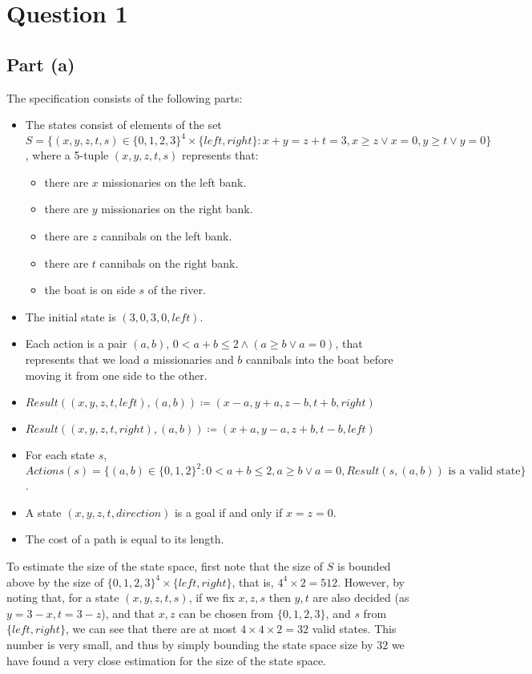 \documentclass[a4paper,12pt]{scrartcl}
\begin{document}
\newcommand{\city}[3]{\setcounter{ctra}{#2}\addtocounter{ctra}{#3}#1[\the\value{ctra}=#2+#3]}
\newcommand{\extracity}[3]{\textbf{\city{#1}{#2}{#3}}}


\section*{Question 1}
\subsection*{Part (a)}
The specification consists of the following parts:
\begin{itemize}
    \item The states consist of elements of the set $S = \{(x, y, z, t, s) \in \{0, 1, 2, 3\}^4 \times \{ left, right \}: x + y = z + t = 3, x \geq z \lor x = 0, y \geq t \lor y = 0\}$, where a 5-tuple $(x, y, z, t, s)$ represents that:
\begin{itemize}
\item there are $x$ missionaries on the left bank.
\item there are $y$ missionaries on the right bank.
\item there are $z$ cannibals on the left bank.
\item there are $t$ cannibals on the right bank.
\item the boat is on side $s$ of the river.
\end{itemize}
\item The initial state is $(3, 0, 3, 0, left)$.
\item Each action is a pair $(a, b)$, $0 < a+b \leq 2 \land (a \geq b \lor a = 0)$, that represents that we load $a$ missionaries and $b$ cannibals into the boat before moving it from one side to the other.
\item $Result((x, y, z, t, left), (a, b)) \coloneqq (x - a, y + a, z - b, t + b, right)$
\item $Result((x, y, z, t, right), (a, b)) \coloneqq (x + a, y - a, z + b, t - b, left)$
\item For each state $s$, $Actions(s) = \{ (a, b) \in \{0, 1, 2\}^2 : 0 < a + b \leq 2, a \geq b \lor a = 0, Result(s, (a, b)) \text{ is a valid state}\}$.
\item A state $(x, y, z, t, direction)$ is a goal if and only if $x = z = 0$.
\item The cost of a path is equal to its length.
\end{itemize}
To estimate the size of the state space, first note that the size of $S$ is bounded above by the size of $\{0, 1, 2, 3\}^4 \times \{left, right\}$, that is, $4^4 \times 2 = 512$. However, by noting that, for a state $(x, y, z, t, s)$, if we fix $x, z, s$ then $y, t$ are also decided (as $y = 3-x, t = 3-z$), and that $x, z$ can be chosen from $\{0, 1, 2, 3 \}$, and $s$ from $\{left, right\}$, we can see that there are at most $4 \times 4 \times 2 = 32$ valid states. This number is very small, and thus by simply bounding the state space size by $32$ we have found a very close estimation for the size of the state space.
\end{document}
